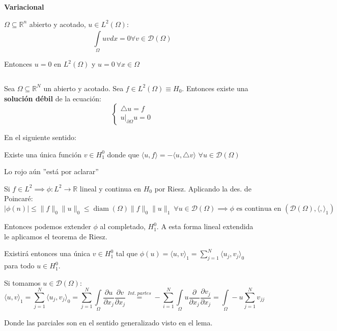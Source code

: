 \documentclass[openany]{book}
\begin{document}
\begin{lemma}
    \textbf{Variacional}

    $ \Omega  \subseteq  \mathbb{R}^{n}$ abierto y acotado, $ u \in L^2(\Omega )$:
    $$ \int\limits_{\Omega }^{} uv dx = 0 \forall  v \in \mathcal{D}(\Omega )$$

    Entonces $ u = 0 $ en $ L^2(\Omega )$ y $ u = 0\ \forall  x \in \Omega $ 
\end{lemma}


\begin{theorem}
    $ $
    
    Sea $ \Omega  \subseteq  \mathbb{R}^{N}$ un abierto y acotado. Sea $ f \in L^2(\Omega ) \equiv H_0$. Entonces existe una \textbf{solución débil} de la ecuación:
    $$ \left\{
    \begin{array}{l}
        \triangle u = f\\ 
        u|_{\partial \Omega } u = 0
    \end{array}
    \right. $$ 

    En el siguiente sentido:

    {\color{red}Existe una única función $ v \in H^{0}_{1}$ donde que $ \langle u, f \rangle = - \langle u, \triangle v \rangle$ $ \forall u \in \mathcal{D}(\Omega )$}

    Lo rojo aún ''está por aclarar''
\end{theorem}


\begin{demonstration}
    Si $ f \in L^2 \implies \phi: L^2 \to \mathbb{R}$ lineal y continua en $ H_0$ por Riesz. Aplicando la des. de Poincaré:
    $$ |\phi(n)| \leq  \|f\|_{0}\|u\|_{0} \leq  \operatorname{diam}(\Omega ) \|f\|_{0}\|u\|_{1}\ \forall  u \in \mathcal{D}(\Omega ) \implies \phi \text{ es continua en } (\mathcal{D}(\Omega ),\langle ,  \rangle_{1}) $$

    Entonces podemos extender $ \phi$ al completado, $ H_1^{0}$. A esta forma lineal extendida le aplicamos el teorema de Riesz.

    Existirá entonces una única $ v \in H_{1}^{0}$ tal que $ \phi(u) = \langle u, v \rangle_{1}  = \sum\limits_{j=1}^{N} \langle u_j, v_j \rangle_{0}$ para todo $ u \in H_1^{0}$.

    Si tomamos $ u \in \mathcal{D}(\Omega )$:
    $$ \langle u, v \rangle_{1} = \sum\limits_{j=1}^{N} \langle u_j, v_j \rangle_{0} = \sum\limits_{j=1}^{N} \int\limits_{\Omega }^{} \dfrac{\partial u}{\partial x_j} \dfrac{\partial v}{\partial x_j} \stackrel{Int.\ partes}{=} -\sum\limits_{i=1}^{N} \int\limits_{\Omega }^{} u\dfrac{\partial }{\partial x_j} \dfrac{\partial v_j}{\partial x_j} = \int\limits_{\Omega }^{}-u \sum\limits_{j=1}^{N}v_{jj} $$

    Donde las parciales son en el sentido generalizado visto en el lema.

\end{demonstration}
\end{document}
